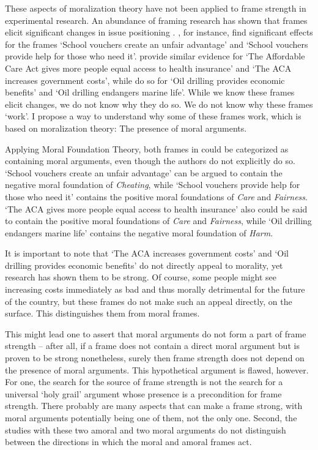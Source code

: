 \documentclass[12pt,]{article}
\begin{document}
These aspects of moralization theory have not been applied to frame
strength in experimental research. An abundance of framing research has
shown that frames elicit significant changes in issue positioning
\citep{chong_counterframing_2013, chong_dynamic_2010, druckman_how_2013, druckman_limits_2001, druckman_source_2012, nelson_media_1997, slothuus_more_2008}.
\citet{brewer_values_2005}, for instance, find significant effects for
the frames `School vouchers create an unfair advantage' and `School
vouchers provide help for those who need it'.
\citet{druckman_source_2012} provide similar evidence for `The
Affordable Care Act gives more people equal access to health insurance'
and `The ACA increases government costs', while
\citet{druckman_how_2013} do so for `Oil drilling provides economic
benefits' and `Oil drilling endangers marine life'. While we know these
frames elicit changes, we do not know why they do so. We do not know why
these frames `work'. I propose a way to understand why some of these
frames work, which is based on moralization theory: The presence of
moral arguments.

Applying Moral Foundation Theory, both frames in
\citet{brewer_values_2005} could be categorized as containing moral
arguments, even though the authors do not explicitly do so. `School
vouchers create an unfair advantage' can be argued to contain the
negative moral foundation of \textit{Cheating}, while `School vouchers
provide help for those who need it' contains the positive moral
foundations of \textit{Care} and \textit{Fairness}. `The ACA gives more
people equal access to health insurance' \citep{druckman_source_2012}
also could be said to contain the positive moral foundations of
\textit{Care} and \textit{Fairness}, while `Oil drilling endangers
marine life' \citep{druckman_how_2013} contains the negative moral
foundation of \textit{Harm}.

It is important to note that `The ACA increases government costs'
\citep{druckman_source_2012} and `Oil drilling provides economic
benefits' \citep{druckman_how_2013} do not directly appeal to morality,
yet research has shown them to be strong. Of course, some people might
see increasing costs immediately as bad and thus morally detrimental for
the future of the country, but these frames do not make such an appeal
directly, on the surface. This distinguishes them from moral frames.

This might lead one to assert that moral arguments do not form a part of
frame strength -- after all, if a frame does not contain a direct moral
argument but is proven to be strong nonetheless, surely then frame
strength does not depend on the presence of moral arguments. This
hypothetical argument is flawed, however. For one, the search for the
source of frame strength is not the search for a universal `holy grail'
argument whose presence is a precondition for frame strength. There
probably are many aspects that can make a frame strong, with moral
arguments potentially being one of them, not the only one. Second, the
studies with these two amoral and two moral arguments do not distinguish
between the directions in which the moral and amoral frames act.
\end{document}
